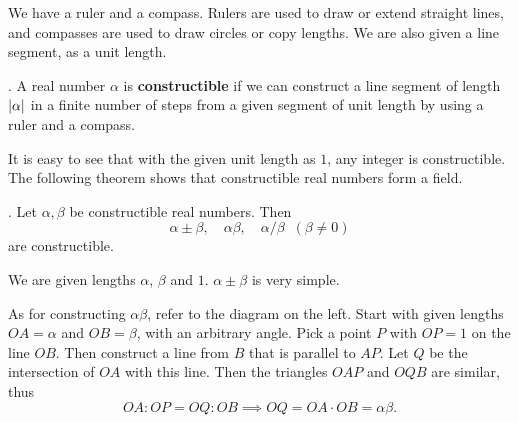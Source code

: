 \pagebreak


We have a ruler and a compass. Rulers are used to draw or extend straight lines, and compasses are used to draw circles or copy lengths. We are also given a line segment, as a unit length.

.  A real number \(\alpha\) is \textbf{constructible} if we can construct a line segment of length \(\left| \alpha \right|\) in a finite number of steps from a given segment of unit length by using a ruler and a compass.

It is easy to see that with the given unit length as \(1\), any integer is constructible. The following theorem shows that constructible real numbers form a field.

\thm. Let \(\alpha, \beta\) be constructible real numbers. Then
\[
    \alpha \pm \beta, \quad \alpha\beta, \quad \alpha / \beta\;\; (\beta \neq 0)
\]
are constructible.

\pf We are given lengths \(\alpha\), \(\beta\) and \(1\). \(\alpha \pm \beta\) is very simple.

As for constructing \(\alpha \beta\), refer to the diagram on the left. Start with given lengths \(OA = \alpha\) and \(OB = \beta\), with an arbitrary angle. Pick a point \(P\) with \(OP = 1\) on the line \(OB\). Then construct a line from \(B\) that is parallel to \(AP\). Let \(Q\) be the intersection of \(OA\) with this line. Then the triangles \(OAP\) and \(OQB\) are similar, thus
\[
    OA : OP = OQ : OB \implies OQ = OA \cdot OB = \alpha \beta.
\]

